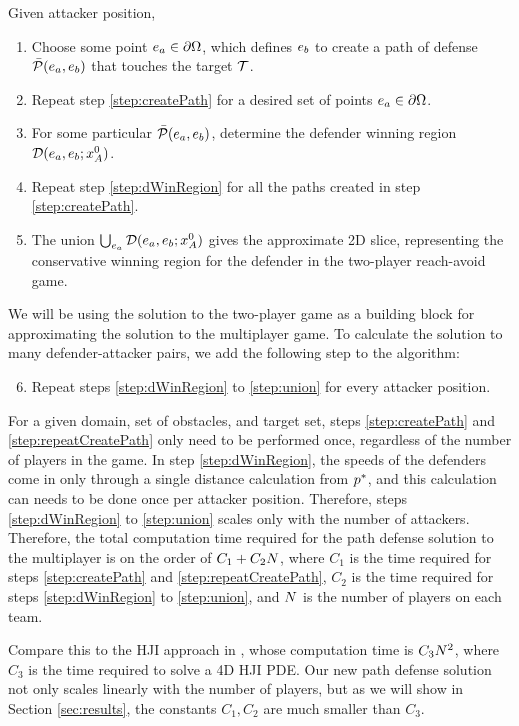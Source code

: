 Given attacker position,
\begin{enumerate}
\item Choose some point $e_a\in\partial\Omega$, which defines $e_b$ to create a path of defense $\bar{\mathcal{P}}(e_a,e_b)$ that touches the target $\mathcal{T}$. \label{step:createPath}
\item Repeat step \ref{step:createPath} for a desired set of points $e_a\in\partial\Omega$. \label{step:repeatCreatePath}
\item For some particular $\bar{\mathcal{P}}(e_a,e_b)$, determine the defender winning region $\mathcal{D}(e_a,e_b;x_A^0)$.\label{step:dWinRegion}
\item Repeat step \ref{step:dWinRegion} for all the paths created in step \ref{step:createPath}.
\item The union $\bigcup_{e_a} \mathcal{D}(e_a,e_b;x_A^0)$ gives the approximate 2D slice, representing the conservative winning region for the defender in the two-player reach-avoid game. \label{step:union}
\end{enumerate}

We will be using the solution to the two-player game as a building block for approximating the solution to the multiplayer game. To calculate the solution to many defender-attacker pairs, we add the following step to the algorithm: 
\begin{enumerate}
\setcounter{enumi}{5}
\item Repeat steps \ref{step:dWinRegion} to \ref{step:union} for every attacker position.
\end{enumerate}

For a given domain, set of obstacles, and target set, steps \ref{step:createPath} and \ref{step:repeatCreatePath} only need to be performed once, regardless of the number of players in the game. In step \ref{step:dWinRegion}, the speeds of the defenders come in only through a single distance calculation from $p^*$, and this calculation can needs to be done once per attacker position. Therefore, steps \ref{step:dWinRegion} to \ref{step:union} scales only with the number of attackers. Therefore, the total computation time required for the path defense solution to the multiplayer is on the order of $C_1 + C_2 N$, where $C_1$ is the time required for steps \ref{step:createPath} and \ref{step:repeatCreatePath}, $C_2$ is the time required for steps \ref{step:dWinRegion} to \ref{step:union}, and $N$ is the number of players on each team. 

Compare this to the HJI approach in \cite{Chen2014}, whose computation time is $C_3 N^2$, where $C_3$ is the time required to solve a 4D HJI PDE. Our new path defense solution not only scales linearly with the number of players, but as we will show in Section \ref{sec:results}, the constants $C_1,C_2$ are much smaller than $C_3$.